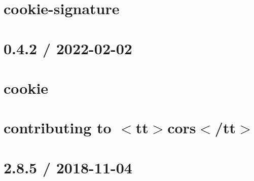 \documentclass[twoside]{book}
\newcommand{\+}{\discretionary{\mbox{\scriptsize$\hookleftarrow$}}{}{}}
\begin{document}
\chapter{cookie-\/signature}
\label{md__c___users_vaishnavi_jadhav__desktop__developer_code_mean_stack_example_server_node_modules_cookie_signature__readme}

\chapter{0.4.2 / 2022-\/02-\/02}
\label{md__c___users_vaishnavi_jadhav__desktop__developer_code_mean_stack_example_server_node_modules_cookie__h_i_s_t_o_r_y}

\chapter{cookie}
\label{md__c___users_vaishnavi_jadhav__desktop__developer_code_mean_stack_example_server_node_modules_cookie__r_e_a_d_m_e}

\chapter{contributing to \texorpdfstring{$<$}{<}tt\texorpdfstring{$>$}{>}cors\texorpdfstring{$<$}{<}/tt\texorpdfstring{$>$}{>}}
\label{md__c___users_vaishnavi_jadhav__desktop__developer_code_mean_stack_example_server_node_modules_cors__c_o_n_t_r_i_b_u_t_i_n_g}

\chapter{2.8.5 / 2018-\/11-\/04}
\label{md__c___users_vaishnavi_jadhav__desktop__developer_code_mean_stack_example_server_node_modules_cors__h_i_s_t_o_r_y}

\end{document}

